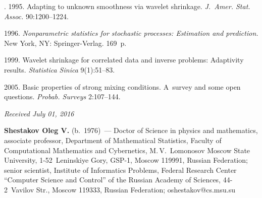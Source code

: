 \begin{multicols}{2}
{{\begin{thebibliography}{99}
{} 
. 1995. Adapting to 
unknown smoothness via wavelet shrinkage. \textit{J.~Amer. Stat. Assoc.} 90:1200--1224.

 1996. 
\textit{Nonparametric statistics for stochastic processes: Estimation and prediction.} 
New York, NY: Springer-Verlag. 169~p.

 1999. Wavelet shrinkage for correlated data 
and inverse problems: Adaptivity results. \textit{Statistica Sinica} 9(1):51--83.

 2005. Basic properties of strong mixing conditions. 
A~survey and some open questions. \textit{Probab. Surveys}  2:107--144.

\end{thebibliography}

 }
 }

\end{multicols}

\vspace*{-3pt}

\hfill{\small\textit{Received July 01, 2016}}

\Contrl

\noindent
\textbf{Shestakov Oleg V.} (b.\ 1976)~--- 
Doctor of Science in physics and mathematics, associate professor, 
Department of Mathematical Statistics, Faculty of Computational Mathematics 
and Cybernetics, M.\,V.~Lomonosov Moscow State University, 1-52~Leninskiye Gory, 
GSP-1, Moscow 119991, Russian Federation; senior scientist, 
Institute of Informatics Problems, Federal Research Center 
``Computer Science and Control''
of the Russian Academy of Sciences, 44-2~Vavilov Str., Moscow 119333, 
Russian Federation; \mbox{oshestakov@cs.msu.su}


\label{end\stat}


\renewcommand{\bibname}{\protect\rm Литература}